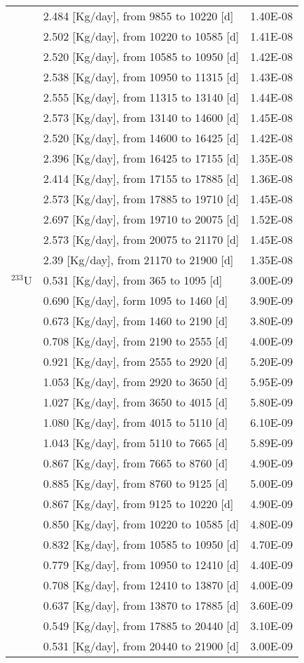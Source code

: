 \begin{longtable}{|p{}|p{}|p{}|}
		&  2.484  [Kg/day], from 9855 to 10220 [d]&		1.40E-08	 \\
		& 2.502  [Kg/day], from 10220 to 10585 [d]&		1.41E-08	 \\
		& 2.520  [Kg/day], from 10585 to 10950 [d]&		1.42E-08	 \\
		&  2.538  [Kg/day], from 10950 to 11315 [d]&		1.43E-08	 \\
		&  2.555  [Kg/day], from 11315 to 13140 [d]&		1.44E-08	 \\
		&  2.573  [Kg/day], from 13140 to 14600 [d]&		1.45E-08	 \\
		&  2.520  [Kg/day], from 14600 to 16425 [d]&		1.42E-08	 \\
		& 2.396  [Kg/day], from 16425 to 17155 [d]&		1.35E-08	 \\
		&  2.414 [Kg/day], from 17155 to 17885 [d]&		1.36E-08	 \\
		& 2.573 [Kg/day], from 17885 to 19710 [d]&		1.45E-08	 \\
		&  2.697 [Kg/day], from 19710 to 20075 [d]&		1.52E-08	 \\
		&  2.573 [Kg/day], from 20075 to 21170 [d]&		1.45E-08	 \\
		&  2.39 [Kg/day], from 21170 to 21900 [d]&		1.35E-08	 \\
		\hline
		$^{233}$U &  0.531 [Kg/day], from 365 to 1095  [d]	&   3.00E-09  \\
		&  0.690 [Kg/day],  form 1095 to 1460 [d] &	3.90E-09 \\
		& 0.673 [Kg/day], from 1460 to 2190 [d] &	3.80E-09 \\
		& 0.708  [Kg/day], from 2190 to 2555 [d] &	4.00E-09 \\
		& 0.921  [Kg/day], from 2555 to 2920 [d] &	5.20E-09 \\
		&   1.053  [Kg/day], from 2920 to 3650 [d] &	5.95E-09 \\
		&  1.027 [Kg/day], from 3650 to 4015 [d] &	5.80E-09 \\
		&  1.080  [Kg/day], from 4015 to 5110 [d] &	6.10E-09 \\
		&  1.043  [Kg/day], from 5110 to 7665 [d] &	5.89E-09 \\
		&  0.867  [Kg/day], from 7665 to 8760 [d] &	4.90E-09 \\
		&  0.885  [Kg/day], from 8760 to 9125 [d] &	5.00E-09 \\
		&  0.867  [Kg/day], from 9125 to 10220 [d] &	4.90E-09 \\
		&  0.850 [Kg/day], from 10220 to 10585 [d] &	4.80E-09 \\
		& 0.832  [Kg/day], from 10585 to 10950 [d] &	4.70E-09 \\
		& 0.779   [Kg/day], from 10950 to 12410 [d] &	4.40E-09 \\
		& 0.708  [Kg/day], from 12410 to 13870 [d] &	4.00E-09 \\
		&  0.637  [Kg/day], from 13870 to 17885 [d] &	3.60E-09 \\
		&  0.549  [Kg/day], from 17885 to 20440 [d] &	3.10E-09 \\
		& 0.531 [Kg/day], from 20440 to 21900 [d] &	3.00E-09 \\
		\hline

\end{longtable}	
